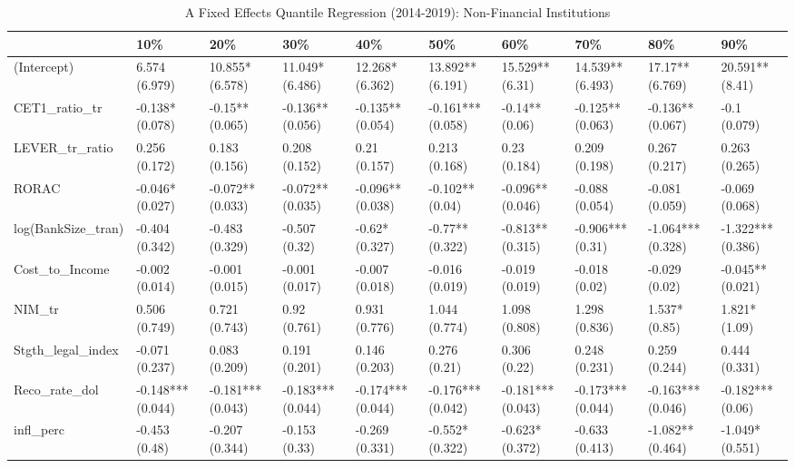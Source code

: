 \begin{table}[ht]
\centering
\caption{A Fixed Effects Quantile Regression (2014-2019): Non-Financial Institutions} 
\begingroup\small
\begin{tabular}{llllllllll}
  \toprule
 & 10\% & 20\% & 30\% & 40\% & 50\% & 60\% & 70\% & 80\% & 90\% \\ 
  \midrule
(Intercept) & 6.574 (6.979) & 10.855* (6.578) & 11.049* (6.486) & 12.268* (6.362) & 13.892** (6.191) & 15.529** (6.31) & 14.539** (6.493) & 17.17** (6.769) & 20.591** (8.41) \\ 
  CET1\_ratio\_tr & -0.138* (0.078) & -0.15** (0.065) & -0.136** (0.056) & -0.135** (0.054) & -0.161*** (0.058) & -0.14** (0.06) & -0.125** (0.063) & -0.136** (0.067) & -0.1 (0.079) \\ 
  LEVER\_tr\_ratio & 0.256 (0.172) & 0.183 (0.156) & 0.208 (0.152) & 0.21 (0.157) & 0.213 (0.168) & 0.23 (0.184) & 0.209 (0.198) & 0.267 (0.217) & 0.263 (0.265) \\ 
  RORAC & -0.046* (0.027) & -0.072** (0.033) & -0.072** (0.035) & -0.096** (0.038) & -0.102** (0.04) & -0.096** (0.046) & -0.088 (0.054) & -0.081 (0.059) & -0.069 (0.068) \\ 
  log(BankSize\_tran) & -0.404 (0.342) & -0.483 (0.329) & -0.507 (0.32) & -0.62* (0.327) & -0.77** (0.322) & -0.813** (0.315) & -0.906*** (0.31) & -1.064*** (0.328) & -1.322*** (0.386) \\ 
  Cost\_to\_Income & -0.002 (0.014) & -0.001 (0.015) & -0.001 (0.017) & -0.007 (0.018) & -0.016 (0.019) & -0.019 (0.019) & -0.018 (0.02) & -0.029 (0.02) & -0.045** (0.021) \\ 
  NIM\_tr & 0.506 (0.749) & 0.721 (0.743) & 0.92 (0.761) & 0.931 (0.776) & 1.044 (0.774) & 1.098 (0.808) & 1.298 (0.836) & 1.537* (0.85) & 1.821* (1.09) \\ 
  Stgth\_legal\_index & -0.071 (0.237) & 0.083 (0.209) & 0.191 (0.201) & 0.146 (0.203) & 0.276 (0.21) & 0.306 (0.22) & 0.248 (0.231) & 0.259 (0.244) & 0.444 (0.331) \\ 
  Reco\_rate\_dol & -0.148*** (0.044) & -0.181*** (0.043) & -0.183*** (0.044) & -0.174*** (0.044) & -0.176*** (0.042) & -0.181*** (0.043) & -0.173*** (0.044) & -0.163*** (0.046) & -0.182*** (0.06) \\ 
  infl\_perc & -0.453 (0.48) & -0.207 (0.344) & -0.153 (0.33) & -0.269 (0.331) & -0.552* (0.322) & -0.623* (0.372) & -0.633 (0.413) & -1.082** (0.464) & -1.049* (0.551) \\ 

\end{tabular}
\end{table}

